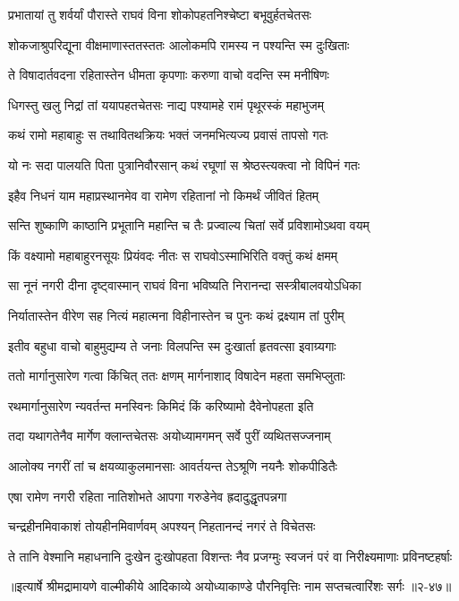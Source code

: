 
\twolineshloka
{प्रभातायां तु शर्वर्यां पौरास्ते राघवं विना}
{शोकोपहतनिश्चेष्टा बभूवुर्हतचेतसः} %

\twolineshloka
{शोकजाश्रुपरिद्यूना वीक्षमाणास्ततस्ततः}
{आलोकमपि रामस्य न पश्यन्ति स्म दुःखिताः} %

\twolineshloka
{ते विषादार्तवदना रहितास्तेन धीमता}
{कृपणाः करुणा वाचो वदन्ति स्म मनीषिणः} %

\twolineshloka
{धिगस्तु खलु निद्रां तां ययापहतचेतसः}
{नाद्य पश्यामहे रामं पृथूरस्कं महाभुजम्} %

\twolineshloka
{कथं रामो महाबाहुः स तथावितथक्रियः}
{भक्तं जनमभित्यज्य प्रवासं तापसो गतः} %

\twolineshloka
{यो नः सदा पालयति पिता पुत्रानिवौरसान्}
{कथं रघूणां स श्रेष्ठस्त्यक्त्वा नो विपिनं गतः} %

\twolineshloka
{इहैव निधनं याम महाप्रस्थानमेव वा}
{रामेण रहितानां नो किमर्थं जीवितं हितम्} %

\twolineshloka
{सन्ति शुष्काणि काष्ठानि प्रभूतानि महान्ति च}
{तैः प्रज्वाल्य चितां सर्वे प्रविशामोऽथवा वयम्} %

\twolineshloka
{किं वक्ष्यामो महाबाहुरनसूयः प्रियंवदः}
{नीतः स राघवोऽस्माभिरिति वक्तुं कथं क्षमम्} %

\twolineshloka
{सा नूनं नगरी दीना दृष्ट्वास्मान् राघवं विना}
{भविष्यति निरानन्दा सस्त्रीबालवयोऽधिका} %

\twolineshloka
{निर्यातास्तेन वीरेण सह नित्यं महात्मना}
{विहीनास्तेन च पुनः कथं द्रक्ष्याम तां पुरीम्} %

\twolineshloka
{इतीव बहुधा वाचो बाहुमुद्यम्य ते जनाः}
{विलपन्ति स्म दुःखार्ता हृतवत्सा इवाग्र्यगाः} %

\twolineshloka
{ततो मार्गानुसारेण गत्वा किंचित् ततः क्षणम्}
{मार्गनाशाद् विषादेन महता समभिप्लुताः} %

\twolineshloka
{रथमार्गानुसारेण न्यवर्तन्त मनस्विनः}
{किमिदं किं करिष्यामो दैवेनोपहता इति} %

\twolineshloka
{तदा यथागतेनैव मार्गेण क्लान्तचेतसः}
{अयोध्यामगमन् सर्वे पुरीं व्यथितसज्जनाम्} %

\twolineshloka
{आलोक्य नगरीं तां च क्षयव्याकुलमानसाः}
{आवर्तयन्त तेऽश्रूणि नयनैः शोकपीडितैः} %

\twolineshloka
{एषा रामेण नगरी रहिता नातिशोभते}
{आपगा गरुडेनेव ह्रदादुद्धृतपन्नगा} %

\twolineshloka
{चन्द्रहीनमिवाकाशं तोयहीनमिवार्णवम्}
{अपश्यन् निहतानन्दं नगरं ते विचेतसः} %

\twolineshloka
{ते तानि वेश्मानि महाधनानि दुःखेन दुःखोपहता विशन्तः}
{नैव प्रजग्मुः स्वजनं परं वा निरीक्ष्यमाणाः प्रविनष्टहर्षाः} %


॥इत्यार्षे श्रीमद्रामायणे वाल्मीकीये आदिकाव्ये अयोध्याकाण्डे पौरनिवृत्तिः नाम सप्तचत्वारिंशः सर्गः ॥२-४७॥
